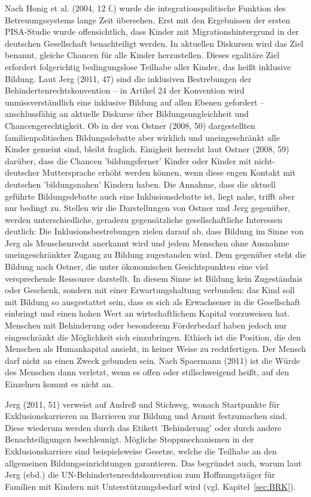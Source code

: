 Nach Honig et al. (2004, 12 f.) wurde die integrationspolitische Funktion des Betreuungssystems lange Zeit übersehen. Erst mit den Ergebnissen der ersten PISA-Studie wurde offensichtlich, dass Kinder mit Migrationshintergrund in der deutschen Gesellschaft benachteiligt werden. In aktuellen Diskursen wird das Ziel benannt, gleiche Chancen für alle Kinder herzustellen. Dieses egalitäre Ziel erfordert folgerichtig bedingungslose Teilhabe aller Kinder, das heißt inklusive Bildung. Laut Jerg (2011, 47) sind die inklusiven Bestrebungen der Behindertenrechtskonvention – in Artikel 24 der Konvention wird unmissverständlich eine inklusive Bildung auf allen Ebenen gefordert – anschlussfähig an aktuelle Diskurse über Bildungsungleichheit und Chancengerechtigkeit. Ob in der von Ostner (2008, 50) dargestellten familienpolitischen Bildungsdebatte aber wirklich und uneingeschränkt alle Kinder gemeint sind, bleibt fraglich. Einigkeit herrscht laut Ostner (2008, 59) darüber, dass die Chancen 'bildungsferner' Kinder oder Kinder mit nicht-deutscher Muttersprache erhöht werden können, wenn diese engen Kontakt mit deutschen 'bildungsnahen' Kindern haben. Die Annahme, dass die aktuell geführte Bildungsdebatte auch eine Inklusionsdebatte ist, liegt nahe, trifft aber nur bedingt zu. Stellen wir die Darstellungen von Ostner und Jerg gegenüber, werden unterschiedliche, geradezu gegensätzliche gesellschaftliche Interessen deutlich: Die Inklusionsbestrebungen zielen darauf ab, dass Bildung im Sinne von Jerg als Menschenrecht anerkannt wird und jedem Menschen ohne Ausnahme uneingeschränkter Zugang zu Bildung zugestanden wird. Dem gegenüber steht die Bildung nach Ostner, die unter ökonomischen Gesichtspunkten eine viel versprechende Ressource darstellt. In diesem Sinne ist Bildung kein Zugeständnis oder Geschenk, sondern mit einer Erwartungshaltung verbunden: das Kind soll mit Bildung so ausgestattet sein, dass es sich als Erwachsener in die Gesellschaft einbringt und einen hohen Wert an wirtschaftlichem Kapital vorzuweisen hat. Menschen mit Behinderung oder besonderem Förderbedarf haben jedoch nur eingeschränkt die Möglichkeit sich einzubringen. Ethisch ist die Position, die den Menschen als Humankapital ansieht, in keiner Weise zu rechtfertigen. Der Mensch darf nicht an einen Zweck gebunden sein. Nach Spaermann (2011) ist die Würde des Menschen dann verletzt, wenn es offen oder stillschweigend heißt, auf den Einzelnen kommt es nicht an. 

Jerg (2011, 51) verweist auf Andreß und Stichweg, wonach Startpunkte für Exklusionskarrieren an Barrieren zur Bildung und Armut festzumachen sind. Diese wiederum werden durch das Etikett 'Behinderung' oder durch andere Benachteiligungen beschleunigt. Mögliche Stoppmechanismen in der Exklusionskarriere sind beispielsweise Gesetze, welche die Teilhabe an den allgemeinen Bildungseinrichtungen garantieren. Das begründet auch, warum laut Jerg (ebd.) die UN-Behindertenrechtskonvention zum Hoffnungsträger für Familien mit Kindern mit Unterstützungsbedarf wird (vgl. Kapitel~\ref{sec:BRK}). 

